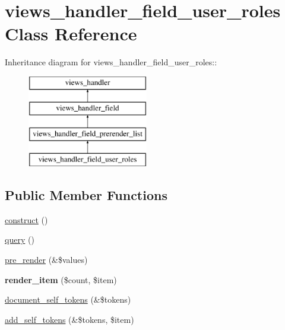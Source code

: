\hypertarget{classviews__handler__field__user__roles}{
\section{views\_\-handler\_\-field\_\-user\_\-roles Class Reference}
\label{classviews__handler__field__user__roles}
}
Inheritance diagram for views\_\-handler\_\-field\_\-user\_\-roles::\begin{figure}[H]
\begin{center}
\leavevmode
\includegraphics[height=4cm]{classviews__handler__field__user__roles}
\end{center}
\end{figure}
\subsection*{Public Member Functions}
\begin{DoxyCompactItemize}
\item 
\hyperlink{classviews__handler__field__user__roles_abf8254566ae390355b35d4593514b033}{construct} ()
\item 
\hyperlink{classviews__handler__field__user__roles_a26513786d88b63b1e2dcfd4aa09c4552}{query} ()
\item 
\hyperlink{classviews__handler__field__user__roles_a34b555f61da756e5494e923e8188d3d7}{pre\_\-render} (\&\$values)
\item 
\hypertarget{classviews__handler__field__user__roles_aea8e9006d630d4efe5d05f38cca151d2}{
{\bfseries render\_\-item} (\$count, \$item)}
\label{classviews__handler__field__user__roles_aea8e9006d630d4efe5d05f38cca151d2}

\item 
\hyperlink{classviews__handler__field__user__roles_a49745a7c1d16f9ee62d5ad6406fe0863}{document\_\-self\_\-tokens} (\&\$tokens)
\item 
\hyperlink{classviews__handler__field__user__roles_aceb9ebe1ca046eec3634c85bb6b114f5}{add\_\-self\_\-tokens} (\&\$tokens, \$item)
\end{DoxyCompactItemize}


